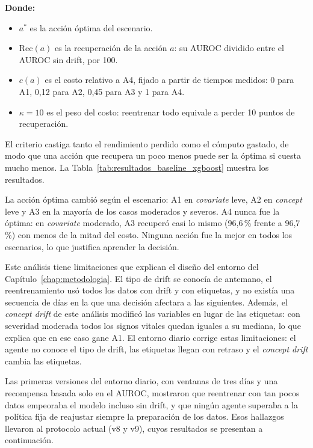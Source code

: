 \noindent\textbf{Donde:}
\begin{itemize}
    \item $a^{*}$ es la acción óptima del escenario.
    \item $\text{Rec}(a)$ es la recuperación de la acción $a$: su AUROC dividido entre el AUROC sin drift, por 100.
    \item $c(a)$ es el costo relativo a A4, fijado a partir de tiempos medidos: 0 para A1, 0,12 para A2, 0,45 para A3 y 1 para A4.
    \item $\kappa = 10$ es el peso del costo: reentrenar todo equivale a perder 10 puntos de recuperación.
\end{itemize}

El criterio castiga tanto el rendimiento perdido como el cómputo gastado, de modo que una acción
que recupera un poco menos puede ser la óptima si cuesta mucho menos. La
Tabla~\ref{tab:resultados_baseline_xgboost} muestra los resultados.



La acción óptima cambió según el escenario: A1 en \textit{covariate} leve, A2 en
\textit{concept} leve y A3 en la mayoría de los casos moderados y severos. A4 nunca fue la
óptima: en \textit{covariate} moderado, A3 recuperó casi lo mismo (96,6\,\% frente a 96,7\,\%)
con menos de la mitad del costo. Ninguna acción fue la mejor en todos los escenarios, lo que
justifica aprender la decisión.

Este análisis tiene limitaciones que explican el diseño del entorno del
Capítulo~\ref{chap:metodologia}. El tipo de drift se conocía de antemano, el reentrenamiento usó
todos los datos con drift y con etiquetas, y no existía una secuencia de días en la que una
decisión afectara a las siguientes. Además, el \textit{concept drift} de este análisis modificó
las variables en lugar de las etiquetas: con severidad moderada todos los signos vitales quedan
iguales a su mediana, lo que explica que en ese caso gane A1. El entorno diario corrige estas
limitaciones: el agente no conoce el tipo de drift, las etiquetas llegan con retraso y el
\textit{concept drift} cambia las etiquetas.

Las primeras versiones del entorno diario, con ventanas de tres días y una recompensa basada
solo en el AUROC, mostraron que reentrenar con tan pocos datos empeoraba el modelo incluso sin
drift, y que ningún agente superaba a la política fija de reajustar siempre la preparación de
los datos. Esos hallazgos llevaron al protocolo actual (v8 y v9), cuyos resultados se presentan
a continuación.

